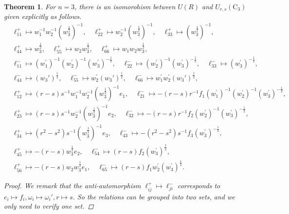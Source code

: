 \documentclass[10pt,a4paper]{amsart}
\newtheorem{theorem}{Theorem}
\numberwithin{equation}{section}
\begin{document}
	 	\begin{theorem}\label{T:C3}
	 	For $n=3$,	there is an isomorohism between $U(R)$ and $U_{r, s}\left(\mathrm{C}_3\right)$ given explicitly as follows.
\begin{align*}
&\ell_{11}^{+}\mapsto w_1^{-1} w_2^{-1}\left(w_3^{{\frac{1}{2}}}\right)^{-1}, \quad \ell_{22}^{+}\mapsto  w_2^{-1}\left(w_3^{{\frac{1}{2}}}\right)^{-1}, \quad \ell_{33}^{+}\mapsto\left(w_3^{{\frac{1}{2}}}\right)^{-1}, \\
&\ell_{44}^{+}\mapsto w_3^{\frac{1}{2}}, \quad \ell_{55}^{+}\mapsto w_2 w_3^{\frac{1}{2}}, \quad \ell_{66}^{+}\mapsto w_1 w_2 w_3^{\frac{1}{2}},\\
&\ell_{11}^{-}\mapsto\left(w_1^{\prime}\right)^{-1}\left(w_2^{\prime}\right)^{-1}\left(w_3^{\prime}\right)^{-\frac{1}{2}},\quad \ell_{22}^{-}\mapsto\left(w_2^{\prime}\right)^{-1}\left(w_3^{\prime}\right)^{-\frac{1}{2}}, \quad \ell_{33}^{-}\mapsto\left(w_3^{\prime}\right)^{-\frac{1}{2}},\\
&\ell_{44}^{-}\mapsto\left(w_3'\right)^{\frac{1}{2}}, \quad \ell_{55}^{-}\mapsto w_2^{\prime}\left(w_3'\right)^{\frac{1}{2}}, \quad \ell_{66}^{-}\mapsto w_1^{\prime} w_2^{\prime}\left(w_3'\right)^{\frac{1}{2}},\\
&\ell_{12}^{+}\mapsto(r-s) s^{-1} w_1^{-1} w_2^{-1}\left(w_3^{\frac{1}{2}}\right)^{-1} e_1, \quad \ell_{21}^{-}\mapsto-(r-s) r^{-1} f_1\left(w_1^{\prime}\right)^{-1}\left(w_2^{\prime}\right)^{-1}\left(w_3^{\prime}\right)^{-\frac{1}{2}},\\
&\ell_{23}^{+}\mapsto(r-s) s^{-1} w_2^{-1}\left(w_3^{\frac{1}{2}}\right)^{-1} e_2, \quad \ell_{32}^{-}\mapsto-(r-s) r^{-1} f_2\left(w_2^{\prime}\right)^{-1}\left(w_3^{\prime}\right)^{-\frac{1}{2}},\\
&\ell_{34}^{+}\mapsto\left(r^2-s^2\right) s^{-1}\left(w_3^{\frac{1}{2}}\right)^{-1} e_3, \quad \ell_{43}^{-}\mapsto-\left(r^2-s^2\right) s^{-1} f_3\left(w_3^{\prime}\right)^{-\frac{1}{2}},\\
&\ell_{45}^{+}\mapsto-(r-s) w_3^{\frac{1}{2}} e_2, \quad \ell_{54}^{-}\mapsto(r-s) f_2\left(w_3^{\prime}\right)^{\frac{1}{2}},\\
&\ell_{56}^{+}\mapsto-(r-s) w_2 w_3^{\frac{1}{2}} e_1, \quad \ell_{65}^{-}\mapsto(r-s) f_1 w_2^{\prime}\left(w_3^{\prime}\right)^{\frac{1}{2}}.
\end{align*}
\begin{proof} We  remark that the anti-automorphism $\ell^+_{ij}\mapsto \ell^-_{ji}$ corresponds to $e_i\mapsto f_i, \omega_i\mapsto \omega_i', r\mapsto s$.
So the relations can be grouped into two sets, and we only need to verify one set.

\end{proof}
\end{theorem}
\end{document}
